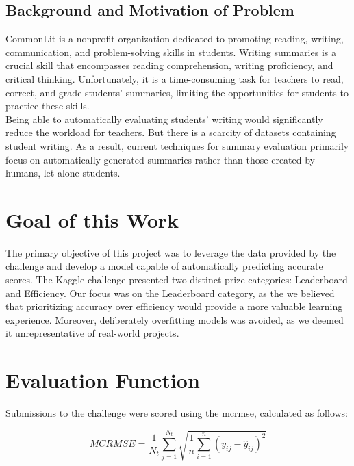 \pagebreak
\subsection{Background and Motivation of Problem}
CommonLit is a nonprofit organization dedicated to promoting reading, writing, communication, and problem-solving skills in students. Writing summaries is a crucial skill that encompasses reading comprehension, writing proficiency, and critical thinking. Unfortunately, it is a time-consuming task for teachers to read, correct, and grade students’ summaries, limiting the opportunities for students to practice these skills.\\
Being able to automatically evaluating students' writing would significantly reduce the workload for teachers. But there is a scarcity of datasets containing student writing. As a result, current techniques for summary evaluation primarily focus on automatically generated summaries rather than those created by humans, let alone students.

\section{Goal of this Work}
The primary objective of this project was to leverage the data provided by the challenge and develop a model capable of automatically predicting accurate scores. The Kaggle challenge presented two distinct prize categories: Leaderboard and Efficiency. Our focus was on the Leaderboard category, as the we believed that prioritizing accuracy over efficiency would provide a more valuable learning experience. Moreover, deliberately overfitting models was avoided, as we deemed it 
unrepresentative of real-world projects.

\section{Evaluation Function}
Submissions to the challenge were scored using the \gls{mcrmse}, calculated as follows:

\begin{equation}\label{eq:mcrmse}
    MCRMSE = \frac{1}{N_t} \sum_{j=1}^{N_t} \sqrt{\frac{1}{n} \sum_{i=1}^{n} (y_{ij} - \hat{y}_{ij})^2}
\end{equation}

